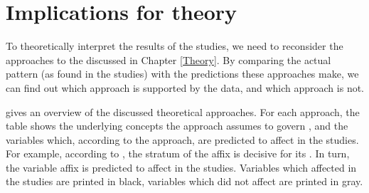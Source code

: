 \section{Implications for theory}


To theoretically interpret the results of the studies, we need to reconsider the approaches to the  discussed in Chapter \ref{Theory}.   By comparing the actual  pattern (as found in the studies) with the predictions these approaches make, we can find out which approach is supported by the data, and which approach is not.



 gives an overview of the discussed theoretical approaches. For each approach, the table shows the underlying concepts the approach assumes to govern , and the variables which, according to the approach, are predicted to affect  in the studies. For example, according to , the stratum of the affix is decisive for its . In turn, the variable affix is predicted to affect  in the studies. 
Variables which affected  in the studies are printed in black, variables which did not affect  are printed in gray.






